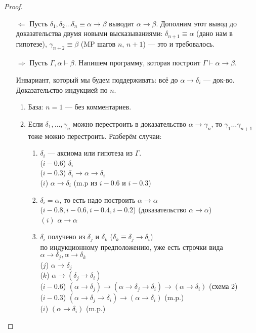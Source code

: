 \begin{proof}
    \begin{itemize}
        \item [$\Leftarrow $]
        Пусть $\delta_1, \delta_2\ldots \delta_n \equiv \alpha \to \beta$ выводит $\alpha \to \beta$.
        Дополним этот вывод до доказательства двумя новыми высказываниями: $\delta_{n+1} \equiv \alpha$ (дано нам в гипотезе), $\gamma_{n+2} \equiv \beta$ (MP шагов $n$, $n+1$) --- это и требовалось.
        \item [$\Rightarrow $]  Пусть $\Gamma, \alpha \vdash \beta$. Напишем программу, которая построит $\Gamma \vdash \alpha \to \beta$.

        Инвариант, который мы будем поддерживать: всё до $\alpha \to \delta_i $ --- док-во.
        Доказательство индукцией по $n$.
        \begin{enumerate}
            \item База: $n=1$ --- без комментариев.
            \item Если $\delta_1,\ldots, \gamma_n$ можно перестроить в доказательство $\alpha \to \gamma_n$, то $\gamma_1 \ldots \gamma_{n+1}$ тоже можно перестроить.
            Разберём случаи:
            \begin{enumerate}
                \item $\delta_i$ --- аксиома или гипотеза из $\Gamma$. \\
                ($i - 0.6$) $\delta_{i}$ \\
                ($i - 0.3$) $\delta_i \to \alpha \to \delta_i$\\
                ($i$) $\alpha \to \delta_i$ (m.p из $i-0.6$ и $i - 0.3$)
                \item $\delta_i = \alpha$, то есть надо построить $\alpha \to \alpha$\\
                ($i - 0.8, i-0.6, i-0.4, i-0.2$) (доказательство $\alpha \to \alpha$) \\
                $(i)$ $\alpha\to\alpha$
                \item $\delta_i$ получено из $\delta_j$ и $\delta_k$ ($\delta_k \equiv \delta_j \to \delta_i$)\\
                по индукционному предположению, уже есть строчки вида $\alpha \to \delta_j, \alpha \to \delta_k$\\
                ($j$) $\alpha \to \delta_j$\\
                ($k$) $\alpha \to (\delta_j \to \delta_i)$\\
                ($i - 0.6$) $(\alpha \to \delta_j) \to (\alpha \to \delta_j \to \delta_i) \to (\alpha \to \delta_i)$ (схема 2)\\
                ($i - 0.3$) $(\alpha \to \delta_j \to \delta_i) \to (\alpha \to \delta_i)$ (m.p.)\\
                ($i$) $(\alpha \to \delta_i)$ (m.p.)
            \end{enumerate}
        \end{enumerate}
    \end{itemize}
\end{proof}

